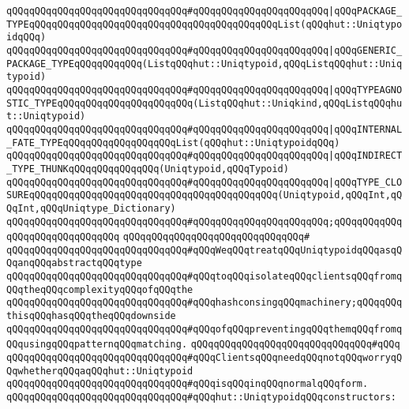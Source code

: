 \verb|qQQqqQQqqQQqqQQqqQQqqQQqqQQqqQQq#qQQqqQQqqQQqqQQqqQQqqQQq|\verb#|qQQqPACKAGE_TYPEqQQqqQQqqQQqqQQqqQQqqQQqqQQqqQQqqQQqqQQqqQQqList(qQQqhut::UniqtypoidqQQq)#\newline
\verb|qQQqqQQqqQQqqQQqqQQqqQQqqQQqqQQq#qQQqqQQqqQQqqQQqqQQqqQQq|\verb#|qQQqGENERIC_PACKAGE_TYPEqQQqqQQqqQQq(ListqQQqhut::Uniqtypoid,qQQqListqQQqhut::Uniqtypoid)#\newline
\verb|qQQqqQQqqQQqqQQqqQQqqQQqqQQqqQQq#qQQqqQQqqQQqqQQqqQQqqQQq|\verb#|qQQqTYPEAGNOSTIC_TYPEqQQqqQQqqQQqqQQqqQQqqQQq(ListqQQqhut::Uniqkind,qQQqListqQQqhut::Uniqtypoid)#\newline
\verb|qQQqqQQqqQQqqQQqqQQqqQQqqQQqqQQq#qQQqqQQqqQQqqQQqqQQqqQQq|\verb#|qQQqINTERNAL_FATE_TYPEqQQqqQQqqQQqqQQqqQQqList(qQQqhut::UniqtypoidqQQq)#\newline
\verb|qQQqqQQqqQQqqQQqqQQqqQQqqQQqqQQq#qQQqqQQqqQQqqQQqqQQqqQQq|\verb#|qQQqINDIRECT_TYPE_THUNKqQQqqQQqqQQqqQQq(Uniqtypoid,qQQqTypoid)#\newline
\verb|qQQqqQQqqQQqqQQqqQQqqQQqqQQqqQQq#qQQqqQQqqQQqqQQqqQQqqQQq|\verb#|qQQqTYPE_CLOSUREqQQqqQQqqQQqqQQqqQQqqQQqqQQqqQQqqQQqqQQqqQQq(Uniqtypoid,qQQqInt,qQQqInt,qQQqUniqtype_Dictionary)#\newline
\verb|qQQqqQQqqQQqqQQqqQQqqQQqqQQqqQQq#qQQqqQQqqQQqqQQqqQQqqQQq;qQQqqQQqqQQqqQQqqQQqqQQqqQQqqQQq|\newline
\verb|qQQqqQQqqQQqqQQqqQQqqQQqqQQqqQQq#|\newline
\verb|qQQqqQQqqQQqqQQqqQQqqQQqqQQqqQQq#qQQqWeqQQqtreatqQQqUniqtypoidqQQqasqQQqanqQQqabstractqQQqtype|\newline
\verb|qQQqqQQqqQQqqQQqqQQqqQQqqQQqqQQq#qQQqtoqQQqisolateqQQqclientsqQQqfromqQQqtheqQQqcomplexityqQQqofqQQqthe|\newline
\verb|qQQqqQQqqQQqqQQqqQQqqQQqqQQqqQQq#qQQqhashconsingqQQqmachinery;qQQqqQQqthisqQQqhasqQQqtheqQQqdownside|\newline
\verb|qQQqqQQqqQQqqQQqqQQqqQQqqQQqqQQq#qQQqofqQQqpreventingqQQqthemqQQqfromqQQqusingqQQqpatternqQQqmatching.|\newline
\verb|qQQqqQQqqQQqqQQqqQQqqQQqqQQqqQQq#qQQq|\newline
\verb|qQQqqQQqqQQqqQQqqQQqqQQqqQQqqQQq#qQQqClientsqQQqneedqQQqnotqQQqworryqQQqwhetherqQQqaqQQqhut::Uniqtypoid|\newline
\verb|qQQqqQQqqQQqqQQqqQQqqQQqqQQqqQQq#qQQqisqQQqinqQQqnormalqQQqform.|\newline
\newline
\newline
\verb|qQQqqQQqqQQqqQQqqQQqqQQqqQQqqQQq#qQQqhut::UniqtypoidqQQqconstructors:|\newline
